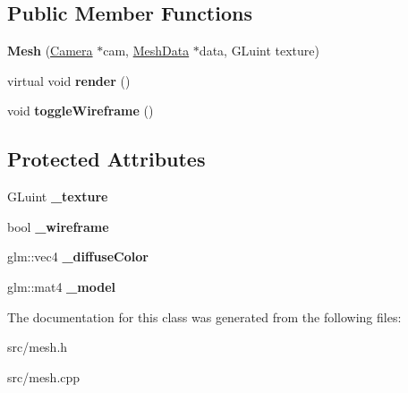 \subsection*{Public Member Functions}
\begin{DoxyCompactItemize}
\item 
\hypertarget{class_mesh_ace06807c618667a649c0d7e59bddde6b}{}{\bfseries Mesh} (\hyperlink{class_camera}{Camera} $\ast$cam, \hyperlink{class_mesh_data}{Mesh\+Data} $\ast$data, G\+Luint texture)\label{class_mesh_ace06807c618667a649c0d7e59bddde6b}

\item 
\hypertarget{class_mesh_aa196429f3e87ecd53e8770ba979222f4}{}virtual void {\bfseries render} ()\label{class_mesh_aa196429f3e87ecd53e8770ba979222f4}

\item 
\hypertarget{class_mesh_a363f6809aa3269a7021a68421f1bb160}{}void {\bfseries toggle\+Wireframe} ()\label{class_mesh_a363f6809aa3269a7021a68421f1bb160}

\end{DoxyCompactItemize}
\subsection*{Protected Attributes}
\begin{DoxyCompactItemize}
\item 
\hypertarget{class_mesh_a22f29d6780b3da1f252d8f3bb99b0be2}{}G\+Luint {\bfseries \+\_\+texture}\label{class_mesh_a22f29d6780b3da1f252d8f3bb99b0be2}

\item 
\hypertarget{class_mesh_ad9fc3eaca88e3ebcde82c16476517e92}{}bool {\bfseries \+\_\+wireframe}\label{class_mesh_ad9fc3eaca88e3ebcde82c16476517e92}

\item 
\hypertarget{class_mesh_a3d161b2b2e8731ffe4d6a24fe3730662}{}glm\+::vec4 {\bfseries \+\_\+diffuse\+Color}\label{class_mesh_a3d161b2b2e8731ffe4d6a24fe3730662}

\item 
\hypertarget{class_mesh_a3f694254f04807332a6edfd2558ab115}{}glm\+::mat4 {\bfseries \+\_\+model}\label{class_mesh_a3f694254f04807332a6edfd2558ab115}

\end{DoxyCompactItemize}


The documentation for this class was generated from the following files\+:\begin{DoxyCompactItemize}
\item 
src/mesh.\+h\item 
src/mesh.\+cpp\end{DoxyCompactItemize}
